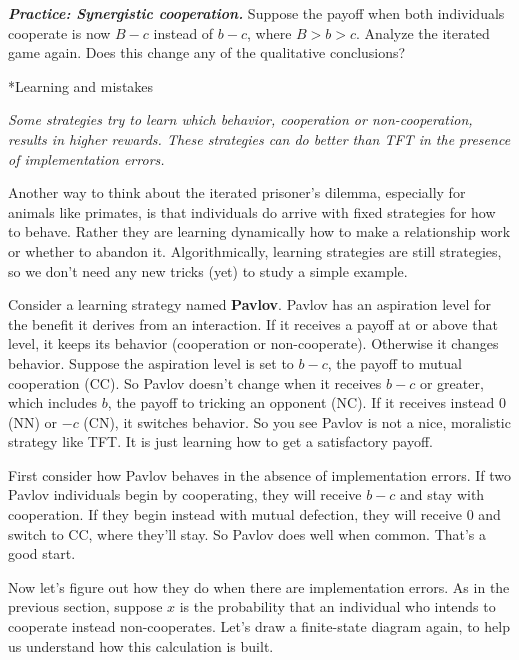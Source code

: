 \documentclass[10pt,reqno]{amsbook}
\makeatletter
\newcommand{\bemph}[1]{{\textbf{\textcolor{bemphcol}{#1}}}}
\renewcommand\section{\@startsection{section}{1}
\z@{.7\linespacing\@plus\linespacing}{.5\linespacing}
{\large\bfseries\itshape}}
\numberwithin{equation}{chapter}
\newenvironment{mathboxmp}[1]
{\begin{tcolorbox}[breakable, enhanced, oversize]\footnotesize\noindent\textbf{\emph{#1}}}
{\end{tcolorbox}}
\newenvironment{precis}
{\noi\itshape}
{\vspace{6pt}}
\newcommand{\noi}{\noindent}
\makeatother
\begin{document}
\begin{mathboxmp}{Practice: Synergistic cooperation.}
Suppose the payoff when both individuals cooperate is now $B-c$ instead of $b-c$, where $B>b>c$. Analyze the iterated game again. Does this change any of the qualitative conclusions?
\end{mathboxmp}

\section*{Learning and mistakes}

\begin{precis}Some strategies try to learn which behavior, cooperation or non-cooperation, results in higher rewards. These strategies can do better than TFT in the presence of implementation errors.\end{precis}

Another way to think about the iterated prisoner's dilemma, especially for animals like primates, is that individuals do arrive with fixed strategies for how to behave. Rather they are learning dynamically how to make a relationship work or whether to abandon it. Algorithmically, learning strategies are still strategies, so we don't need any new tricks (yet) to study a simple example.

Consider a learning strategy named \bemph{Pavlov}. Pavlov has an aspiration level for the benefit it derives from an interaction. If it receives a payoff at or above that level, it keeps its behavior (cooperation or non-cooperate). Otherwise it changes behavior. Suppose the aspiration level is set to $b-c$, the payoff to mutual cooperation (CC). So Pavlov doesn't change when it receives $b-c$  or greater, which includes $b$, the payoff to tricking an opponent (NC). If it receives instead $0$ (NN) or $-c$ (CN), it switches behavior. So you see Pavlov is not a nice, moralistic strategy like TFT. It is just learning how to get a satisfactory payoff. 

First consider how Pavlov behaves in the absence of implementation errors. If two Pavlov individuals begin by cooperating, they will receive $b-c$ and stay with cooperation. If they begin instead with mutual defection, they will receive $0$ and switch to CC, where they'll stay. So Pavlov does well when common. That's a good start.

Now let's figure out how they do when there are implementation errors. As in the previous section, suppose $x$ is the probability that an individual who intends to cooperate instead non-cooperates. Let's draw a finite-state diagram again, to help us understand how this calculation is built.
\end{document}
